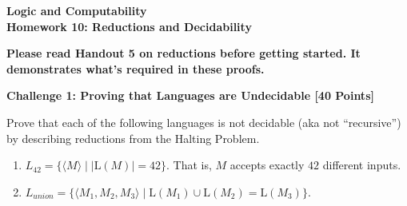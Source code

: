 \documentclass[12pt]{article}
\newcommand{\LL}{\text{L}}
\newcommand{\Problem}[3]{\mbox{} \newline \noindent \textbf{\textbf{Challenge #1: #2 [#3 Points] \\ }}}
\begin{document}
\begin{center}
	\bf
	Logic and Computability \\
	Homework 10:  Reductions and Decidability \\
\end{center}

\noindent \textbf{Please read Handout 5 on reductions before getting started.  It demonstrates what's required in these proofs.}

\Problem{1}{Proving that Languages are Undecidable}{40}

Prove that each of the following languages is not decidable (aka not ``recursive'') by
describing reductions from the Halting Problem. 
        \begin{enumerate}
        	   	\item $L_{42} =  \{ \langle M\rangle \mid  \mbox{$|\LL(M)| = 42$} \}$.  That is, $M$ accepts exactly $42$ different inputs.
	            \item $L_{union} = \{ \langle M_{1}, M_{2}, M_{3} \rangle \mid \LL(M_{1}) \cup \LL(M_{2}) = \LL(M_{3}) \}$.
        \end{enumerate}
\end{document}
